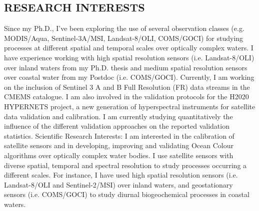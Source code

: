\documentclass[11pt]{res}
\begin{document}
\begin{resume}
\section{RESEARCH INTERESTS}
Since my Ph.D., I’ve been exploring the use of several observation classes (e.g. MODIS/Aqua, Sentinel-3A/MSI, Landsat-8/OLI, COMS/GOCI) for studying processes at different spatial and temporal scales over optically complex waters. I have experience working with high spatial resolution sensors (i.e. Landsat-8/OLI) over inland waters from my Ph.D. thesis and medium spatial resolution sensors over coastal water from my Postdoc (i.e. COMS/GOCI). Currently, I am working on the inclusion of Sentinel 3 A and B Full Resolution (FR) data streams in the CMEMS catalogue. I am also involved in the validation protocols for the H2020 HYPERNETS project, a new generation of hyperspectral instruments for satellite data validation and calibration. I am currently studying quantitatively the influence of the different validation approaches on the reported validation statistics.
Scientific Research Interests:
I am interested in the calibration of satellite sensors and in developing, improving and validating Ocean Colour algorithms over optically complex water bodies. I use satellite sensors with diverse spatial, temporal and spectral resolution to study processes occurring a different scales. For instance, I have used high spatial resolution sensors (i.e. Landsat-8/OLI and Sentinel-2/MSI) over inland waters, and geostationary sensors (i.e. COMS/GOCI) to study diurnal biogeochemical processes in coastal waters.



\end{resume}
\end{document}
